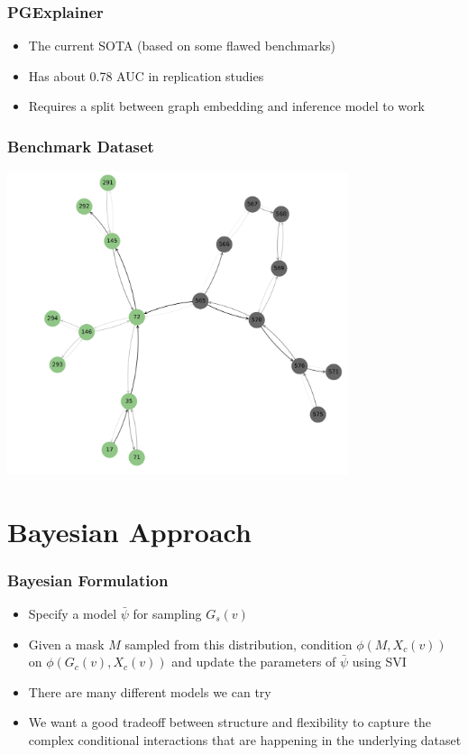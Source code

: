 \documentclass[11pt]{beamer}
\begin{document}
\begin{frame}
    \frametitle{PGExplainer}

    \begin{itemize}
        \item The current SOTA (based on some flawed benchmarks)
        \item Has about 0.78 AUC in replication studies
        \item Requires a split between graph embedding and inference model to work
    \end{itemize}
\end{frame}

\begin{frame}
    \frametitle{Benchmark Dataset}
    
    \begin{center}
        \includegraphics[width=0.75\textwidth]{tree_cycles.png}
    \end{center}
\end{frame}

\section{Bayesian Approach}
\begin{frame}
    \frametitle{Bayesian Formulation}

    \begin{itemize}
        \item Specify a model $\bar{\psi}$ for sampling $G_s(v)$
        \item Given a mask $M$ sampled from this distribution, condition $\phi(M, X_c(v))$ on $\phi(G_c(v), X_c(v))$ and update the parameters of $\bar{\psi}$ using SVI
        \item There are many different models we can try
        \item We want a good tradeoff between structure and flexibility to capture the complex conditional interactions that are happening in the underlying dataset
    \end{itemize}
\end{frame}
\end{document}
